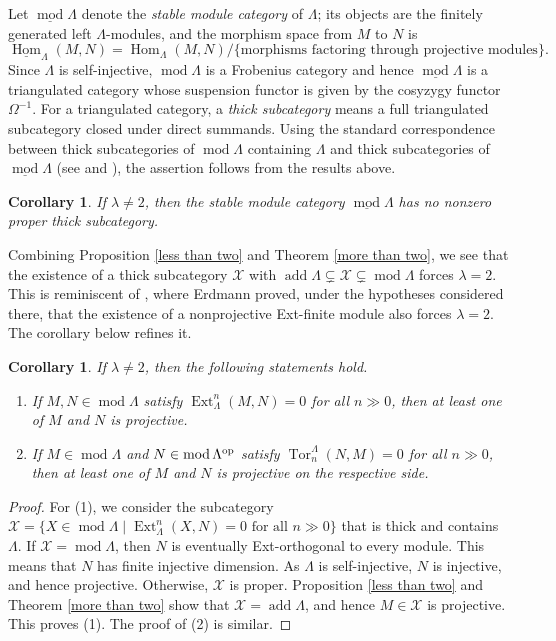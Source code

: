 \documentclass{amsart}
\newtheorem{cor}[thm]{Corollary}
\theoremstyle{definition}
\theoremstyle{remark}
\numberwithin{equation}{thm}
\def\add{\operatorname{add}}
\def\Ext{\operatorname{Ext}}
\def\Hom{\operatorname{Hom}}
\def\L{\Lambda}
\def\mod{\operatorname{mod}}
\def\Tor{\operatorname{Tor}}
\def\X{\mathcal{X}}
\begin{document}
Let $\underline{\mod}\L$ denote the \textit{stable module category} of $\L$; its objects are the finitely generated left $\L$-modules, and the morphism space from $M$ to $N$ is
$$
\underline{\Hom}_\L(M,N)=\Hom_\L(M,N)/\{\text{morphisms factoring through projective modules}\}.
$$
Since $\L$ is self-injective, $\mod\L$ is a Frobenius category and hence $\underline{\mod}\L$ is a triangulated category whose suspension functor is given by the cosyzygy functor $\Omega^{-1}$.
For a triangulated category, a \textit{thick subcategory} means a full triangulated subcategory closed under direct summands.
Using the standard correspondence between thick subcategories of $\mod\L$ containing $\L$ and thick subcategories of $\underline{\mod}\L$ (see \cite[Theorem 1 and Remark 2]{KS} and \cite[Theorem 2.1]{R}), the assertion follows from the results above.

\begin{cor}\label{stable corollary}
If $\lambda\ne 2$, then the stable module category $\underline{\mod}\L$ has no nonzero proper thick subcategory.
\end{cor}

Combining Proposition \ref{less than two} and Theorem \ref{more than two}, we see that the existence of a thick subcategory $\X$ with $\add\L\subsetneq\X\subsetneq\mod\L$ forces $\lambda=2$. This is reminiscent of \cite[Proposition 3.6]{E}, where Erdmann proved, under the hypotheses considered there, that the existence of a nonprojective Ext-finite module also forces $\lambda=2$.
The corollary below refines it.

\begin{cor}\label{Ext Tor rigidity}
If $\lambda\ne 2$, then the following statements hold.
\begin{enumerate}[{\rm (1)}]
\item
If $M,N\in\mod\L$ satisfy $\Ext_\L^n(M,N)=0$ for all $n\gg0$, then at least one of $M$ and $N$ is projective.
\item If $M\in\mod\L$ and $N\in\mod\L^{\rm op}$ satisfy $\Tor_n^\L(N,M)=0$ for all $n\gg0$, then at least one of $M$ and $N$ is projective on the respective side.
\end{enumerate}
\end{cor}

\begin{proof}
For (1), we consider the subcategory $\X=\{X\in\mod\L\mid \Ext_\L^n(X,N)=0\text{ for all }n\gg0\}$ that is thick and contains $\L$.
If $\X=\mod\L$, then $N$ is eventually Ext-orthogonal to every module. This means that $N$ has finite injective dimension.
As $\L$ is self-injective, $N$ is injective, and hence projective.
Otherwise, $\X$ is proper.
Proposition \ref{less than two} and Theorem \ref{more than two} show that $\X=\add\L$, and hence $M\in\X$ is projective.
This proves (1). The proof of (2) is similar.
\end{proof}
\end{document}
